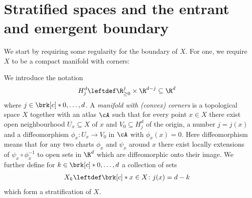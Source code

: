 



\section{Stratified spaces and the entrant and emergent boundary}

We start by requiring some regularity for the boundary of $X$.
For one, we require $X$ to be a compact manifold with corners:
\begin{definition}
  We introduce the notation
  \begin{align*}
    H_j^d\leftdef\R_{\geq0}^j\times\R^{d-j}\subseteq\R^d
  \end{align*}
  where $j\in\brk[c]*{0,\dots,d}$.
  A \emph{manifold with (convex) corners} is a topological space $X$ together with an atlas $\cA$ such that for every point
  $x\in X$ there exist open neighbourhood $U_x\subseteq X$ of $x$ and $V_0\subseteq H_j^d$ of the origin, a number $j=j(x)$ and a
  diffeomorphism $\phi_x\colon U_x\to V_0$ in $\cA$ with $\phi_x(x)=0$.
  Here diffeomorphism means that for any two charts $\phi_x$ and $\psi_x$ around $x$ there
  exist locally extensions of $\psi_x\circ\phi_x^{-1}$ to open sets
  in $\R^d$ which are diffeomorphic onto their image.
  We further define for $k\in\brk[c]*{0,\dots,d}$ a collection of sets 
  \begin{align}
    X_k\leftdef\brk[c]*{x\in X\colon j(x)=d-k}\label{eq:def_mfCorners_stratification}
  \end{align}
  which form a stratification of $X$.
\end{definition}

